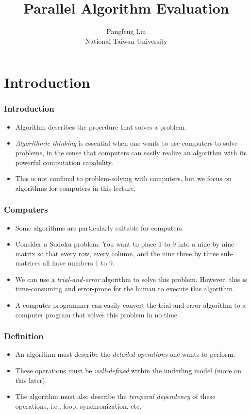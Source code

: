 \documentclass{beamer}
\begin{document}
\begin{CJK}{UTF8}{bsmi}

\title{Parallel Algorithm Evaluation}

\author{Pangfeng Liu \\ National Taiwan University}

\begin{frame}
\titlepage
\end{frame}

\section{Introduction} 

\begin{frame}
\frametitle{Introduction}
\begin{itemize}
\item Algorithm describes the procedure that solves a problem.
\item {\em Algorithmic thinking} is essential when one wants to use computers to solve problems, in the sense that computers can easily realize an algorithm with its powerful computation capability.
\item This is not confined to problem-solving with computers, but we focus on algorithms for computers in this lecture.
\end{itemize}
\end{frame}

\begin{frame}
\frametitle{Computers}
\begin{itemize}
\item Some algorithms are particularly suitable for computers.
\item Consider a Sudoku problem.
You want to place 1 to 9 into a nine by nine matrix so that every row, every column, and the nine three by three sub-matrices all have numbers 1 to 9.
\item We can use a {\em trial-and-error} algorithm to solve this problem.
However, this is time-consuming and error-prone for the human to execute this algorithm.
\item A computer programmer can easily convert the trial-and-error algorithm to a computer program that solves this problem in no time.
\end{itemize}
\end{frame}

\begin{frame}
\frametitle{Definition}
\begin{itemize}
\item An algorithm must describe the {\em detailed operations} one
  wants to perform.
\item These operations must be {\em well-defined} within the underling
  model (more on this later).
\item The algorithm must also describe the {\em temporal dependency}
  of these operations, i.e., loop, synchronization, etc.
\end{itemize}
\end{frame}


\end{CJK}
\end{document}

